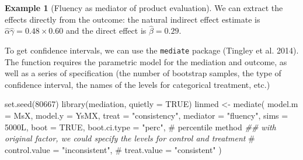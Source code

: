 \documentclass[
  11pt,
  letterpaper,
]{scrbook}
\newenvironment{Shaded}{\begin{snugshade}}{\end{snugshade}}
\newcommand{\AttributeTok}[1]{\textcolor[rgb]{0.40,0.45,0.13}{#1}}
\newcommand{\CommentTok}[1]{\textcolor[rgb]{0.37,0.37,0.37}{#1}}
\newcommand{\ConstantTok}[1]{\textcolor[rgb]{0.56,0.35,0.01}{#1}}
\newcommand{\DecValTok}[1]{\textcolor[rgb]{0.68,0.00,0.00}{#1}}
\newcommand{\DocumentationTok}[1]{\textcolor[rgb]{0.37,0.37,0.37}{\textit{#1}}}
\newcommand{\FunctionTok}[1]{\textcolor[rgb]{0.28,0.35,0.67}{#1}}
\newcommand{\NormalTok}[1]{\textcolor[rgb]{0.00,0.23,0.31}{#1}}
\newcommand{\OtherTok}[1]{\textcolor[rgb]{0.00,0.23,0.31}{#1}}
\newcommand{\StringTok}[1]{\textcolor[rgb]{0.13,0.47,0.30}{#1}}
\theoremstyle{definition}
\theoremstyle{definition}
\newtheorem{example}{Example}[chapter]
\theoremstyle{remark}
\begin{document}
\begin{example}[Fluency as mediator of product
evaluation]
\begin{table}
\begin{minipage}{0.50\linewidth}
{}

\end{minipage}%
%
\begin{minipage}{0.50\linewidth}



\end{minipage}%

\end{table}%

We can extract the effects directly from the outcome: the natural
indirect effect estimate is
\(\widehat{\alpha}\widehat{\gamma} = 0.48 \times 0.60\) and the direct
effect is \(\widehat{\beta} = 0.29\).

To get confidence intervals, we can use the \texttt{mediate} package
(Tingley et al. 2014). The function requires the parametric model for
the mediation and outcome, as well as a series of specification (the
number of bootstrap samples, the type of confidence interval, the names
of the levels for categorical treatment, etc.)

\begin{Shaded}
\begin{Highlighting}[]
\FunctionTok{set.seed}\NormalTok{(}\DecValTok{80667}\NormalTok{)}
\FunctionTok{library}\NormalTok{(mediation, }\AttributeTok{quietly =} \ConstantTok{TRUE}\NormalTok{)}
\NormalTok{linmed }\OtherTok{\textless{}{-}} \FunctionTok{mediate}\NormalTok{(}
  \AttributeTok{model.m =}\NormalTok{ MsX,}
  \AttributeTok{model.y =}\NormalTok{ YsMX,}
  \AttributeTok{treat =} \StringTok{"consistency"}\NormalTok{,}
  \AttributeTok{mediator =} \StringTok{"fluency"}\NormalTok{,}
  \AttributeTok{sims =} \DecValTok{5000}\NormalTok{L,}
  \AttributeTok{boot =} \ConstantTok{TRUE}\NormalTok{,}
  \AttributeTok{boot.ci.type =} \StringTok{"perc"}\NormalTok{, }\CommentTok{\# percentile method}
\DocumentationTok{\#\# with original factor, we could specify the levels for control and treatment}
\CommentTok{\#  control.value = "inconsistent", }
\CommentTok{\#  treat.value = "consistent"}
\NormalTok{)}
\end{Highlighting}
\end{Shaded}


\end{example}
\end{document}
